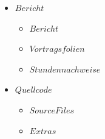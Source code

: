 \documentclass[12pt,a4paper,bibliography=totoc,listof=totoc]{scrartcl}
\begin{document}
\begin{itemize}
	\item $Bericht$
	\begin {itemize}
		\item $Bericht$
		\item $Vortragsfolien$
		\item $Stundennachweise$
	\end {itemize}
	\item $Quellcode$
	\begin{itemize}
		\item $Source Files$
		\item $Extras$
	\end {itemize}
\end{itemize}
\pagebreak
\end{document}
